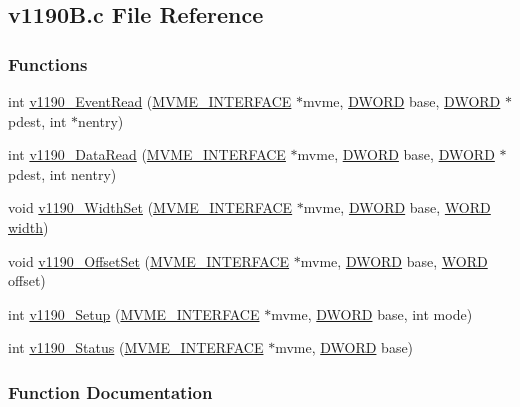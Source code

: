 \subsection{v1190B.c File Reference}
\label{v1190B_8c}
\subsubsection*{Functions}
\begin{DoxyCompactItemize}
\item 
int \hyperlink{v1190B_8c_a2e170ba3dc7d7492affdfad8fbc6338b}{v1190\_\-EventRead} (\hyperlink{structMVME__INTERFACE}{MVME\_\-INTERFACE} $\ast$mvme, \hyperlink{vt2_8h_a798af1e30bc65f319c1a246cecf59e39}{DWORD} base, \hyperlink{vt2_8h_a798af1e30bc65f319c1a246cecf59e39}{DWORD} $\ast$pdest, int $\ast$nentry)
\item 
int \hyperlink{v1190B_8c_a3fb3376a4705f511733ade46e23388e3}{v1190\_\-DataRead} (\hyperlink{structMVME__INTERFACE}{MVME\_\-INTERFACE} $\ast$mvme, \hyperlink{vt2_8h_a798af1e30bc65f319c1a246cecf59e39}{DWORD} base, \hyperlink{vt2_8h_a798af1e30bc65f319c1a246cecf59e39}{DWORD} $\ast$pdest, int nentry)
\item 
void \hyperlink{v1190B_8c_af9175bc6e8cd2dc1c63dbd69d974f8a1}{v1190\_\-WidthSet} (\hyperlink{structMVME__INTERFACE}{MVME\_\-INTERFACE} $\ast$mvme, \hyperlink{vt2_8h_a798af1e30bc65f319c1a246cecf59e39}{DWORD} base, \hyperlink{vt2_8h_a2b0e863dadf920709ec53d9088ee7c91}{WORD} \hyperlink{myexpt_8html_a5558ace5433f9aabbf0a0ec059900d94}{width})
\item 
void \hyperlink{v1190B_8c_a47b04f666b0640f4ec4b5b03a78bcff5}{v1190\_\-OffsetSet} (\hyperlink{structMVME__INTERFACE}{MVME\_\-INTERFACE} $\ast$mvme, \hyperlink{vt2_8h_a798af1e30bc65f319c1a246cecf59e39}{DWORD} base, \hyperlink{vt2_8h_a2b0e863dadf920709ec53d9088ee7c91}{WORD} offset)
\item 
int \hyperlink{v1190B_8c_a08c507c60af774a2828a1e0ff6eac4c2}{v1190\_\-Setup} (\hyperlink{structMVME__INTERFACE}{MVME\_\-INTERFACE} $\ast$mvme, \hyperlink{vt2_8h_a798af1e30bc65f319c1a246cecf59e39}{DWORD} base, int mode)
\item 
int \hyperlink{v1190B_8c_a620a197083a0d776491f7bd620e2effd}{v1190\_\-Status} (\hyperlink{structMVME__INTERFACE}{MVME\_\-INTERFACE} $\ast$mvme, \hyperlink{vt2_8h_a798af1e30bc65f319c1a246cecf59e39}{DWORD} base)
\end{DoxyCompactItemize}


\subsubsection{Function Documentation}
